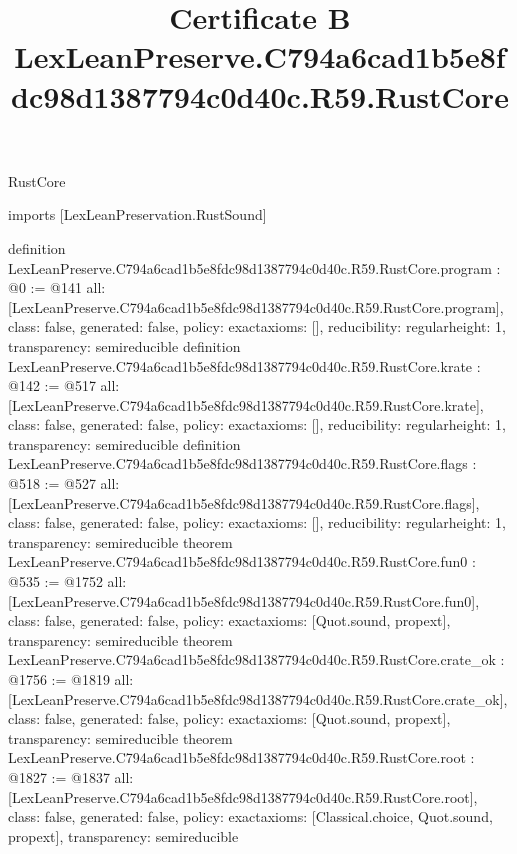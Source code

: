 \begin{lexlean}{RustCore}
\title{Certificate B LexLeanPreserve.C794a6cad1b5e8fdc98d1387794c0d40c.R59.RustCore}
\begin{coremodule}
imports [LexLeanPreservation.RustSound]

definition LexLeanPreserve.C794a6cad1b5e8fdc98d1387794c0d40c.R59.RustCore.program : @0 := @141 {
  all: [LexLeanPreserve.C794a6cad1b5e8fdc98d1387794c0d40c.R59.RustCore.program],
  class: false,
  generated: false,
  policy: exact{axioms: []},
  reducibility: regular{height: 1},
  transparency: semireducible
}
definition LexLeanPreserve.C794a6cad1b5e8fdc98d1387794c0d40c.R59.RustCore.krate : @142 := @517 {
  all: [LexLeanPreserve.C794a6cad1b5e8fdc98d1387794c0d40c.R59.RustCore.krate],
  class: false,
  generated: false,
  policy: exact{axioms: []},
  reducibility: regular{height: 1},
  transparency: semireducible
}
definition LexLeanPreserve.C794a6cad1b5e8fdc98d1387794c0d40c.R59.RustCore.flags : @518 := @527 {
  all: [LexLeanPreserve.C794a6cad1b5e8fdc98d1387794c0d40c.R59.RustCore.flags],
  class: false,
  generated: false,
  policy: exact{axioms: []},
  reducibility: regular{height: 1},
  transparency: semireducible
}
theorem LexLeanPreserve.C794a6cad1b5e8fdc98d1387794c0d40c.R59.RustCore.fun0 : @535 := @1752 {
  all: [LexLeanPreserve.C794a6cad1b5e8fdc98d1387794c0d40c.R59.RustCore.fun0],
  class: false,
  generated: false,
  policy: exact{axioms: [Quot.sound, propext]},
  transparency: semireducible
}
theorem LexLeanPreserve.C794a6cad1b5e8fdc98d1387794c0d40c.R59.RustCore.crate_ok : @1756 := @1819 {
  all: [LexLeanPreserve.C794a6cad1b5e8fdc98d1387794c0d40c.R59.RustCore.crate_ok],
  class: false,
  generated: false,
  policy: exact{axioms: [Quot.sound, propext]},
  transparency: semireducible
}
theorem LexLeanPreserve.C794a6cad1b5e8fdc98d1387794c0d40c.R59.RustCore.root : @1827 := @1837 {
  all: [LexLeanPreserve.C794a6cad1b5e8fdc98d1387794c0d40c.R59.RustCore.root],
  class: false,
  generated: false,
  policy: exact{axioms: [Classical.choice, Quot.sound, propext]},
  transparency: semireducible
}


\end{coremodule}
\end{lexlean}
